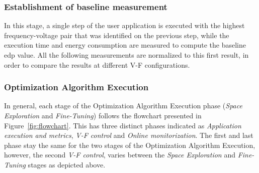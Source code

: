 


\subsubsection{Establishment of baseline measurement}

In this stage, a single step of the user application is executed with the highest frequency-voltage pair that was identified on the previous step, while the execution time and energy consumption are measured to compute the baseline \acrshort{edp} value. All the following measurements are normalized to this first result, in order to compare the results at different V-F configurations.

\subsubsection{Optimization Algorithm Execution}

In general, each stage of the Optimization Algorithm Execution phase (\textit{Space Exploration} and \textit{Fine-Tuning}) follows the flowchart presented in Figure~\ref{fig:flowchart}. This has three distinct phases indicated as \textit{Application execution and metrics}, \textit{V-F control} and \textit{Online monitorization}. The first and last phase stay the same for the two stages of the Optimization Algorithm Execution, however, the second \textit{V-F control}, varies between the \textit{Space Exploration} and \textit{Fine-Tuning} stages as depicted above.

